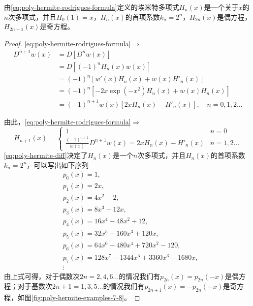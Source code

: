 \begin{subappendices}
\begin{theorem}
  \label{theorem:poly-jacobi-poly-properties}
  由\eqref{eq:poly-hermite-rodrigues-formula}定义的埃米特多项式$H_n(x)$是一个关于$x$的$n$次多项式，并且$H_0(1)=x$，$H_n(x)$的首项系数$k_n=2^n$，$H_{2n}(x)$是偶方程，$H_{2n+1}(x)$是奇方程。
\end{theorem}
\begin{proof}
  \eqref{eq:poly-hermite-rodrigues-formula}$\Rightarrow$
  \begin{equation}
    \label{eq:poly-hermite-dnplus1}
    \begin{split}
      D^{n+1}w(x) &= D \left[D^n w(x) \right] \\
      &= D \left[ (-1)^n H_n(x) w(x) \right] \\
      &= (-1)^n \left[ w'(x) H_n(x) + w(x) H'_n(x) \right] \\
      &= (-1)^n \left[ -2x \exp(-x^2) H_n(x) + w(x) H_n(x) \right] \\
      &= (-1)^{n+1} w(x) \left[ 2x H_n(x) - H'_n(x) \right], \quad n=0,1,2 \ldots
    \end{split}
  \end{equation}

  由此，\eqref{eq:poly-hermite-rodrigues-formula}$\Rightarrow$
  \begin{equation} \label{eq:poly-hermite-diff}
        H_{n+1}(x) = \begin{cases}
        1 & n=0 \\
        \frac{(-1)^{n+1}}{w(x)} D^{n+1} w(x)=2x H_n(x)-H'_n(x) & n=1,2\ldots
        \end{cases}
  \end{equation}
\eqref{eq:poly-hermite-diff}决定了$H_n(x)$是一个$n$次多项式，并且$H_n(x)$的首项系数$k_n=2^n$，可以写出如下序列
\begin{align*}
  &p_0(x) = 1,\\
  &p_1(x) = 2x,\\
  &p_2(x) = 4x^2-2,\\
  &p_3(x) = 8x^3 - 12x,\\
  &p_4(x) = 16 x^4 - 48 x^2 + 12, \\
  &p_5(x) = 32x^5 - 160x^3 + 120x,\\
  &p_6(x) = 64 x^6 - 480 x^4 + 720 x^2 - 120,\\
  &p_7(x) = 128 x^7 - 1344 x^5 + 3360x^3 - 1680x,\\
  &\vdots
\end{align*}
由上式可得，对于偶数次$2n=2,4,6 \ldots$的情况我们有$p_{2n}(x)=p_{2n}(-x)$是偶方程；对于基数次$2n+1=1,3,5 \ldots$的情况我们有$p_{2n+1}(x)=-p_{2n}(-x)$是奇方程，如图\ref{fig:poly-hermite-examples-7-8}。


\end{proof}
\end{subappendices}
